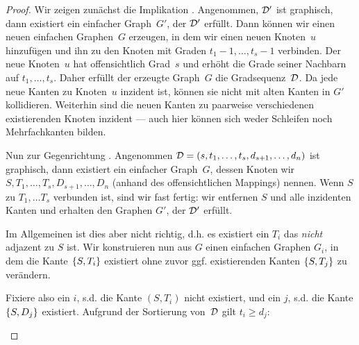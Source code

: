 \begin{proof}
    Wir  zeigen zunächst die Implikation .
    Angenommen, $\degseq'$ ist graphisch, dann existiert ein einfacher Graph~$G'$, der $\degseq'$ erfüllt.
    Dann können wir einen neuen einfachen Graphen~$G$ erzeugen, in dem wir einen neuen Knoten~$u$ hinzufügen und ihn zu den Knoten mit Graden $t_1{-}1, \ldots, t_s{-}1$ verbinden.
    Der neue Knoten~$u$ hat offensichtlich Grad~$s$ und erhöht die Grade seiner Nachbarn auf $t_1, \ldots, t_s$.
    Daher erfüllt der erzeugte Graph~$G$ die Gradsequenz~$\degseq$.
    Da jede neue Kanten zu Knoten~$u$ inzident ist, können sie nicht mit alten Kanten in $G'$ kollidieren.
    Weiterhin sind die neuen Kanten zu paarweise verschiedenen existierenden Knoten inzident --- auch hier können sich weder Schleifen noch Mehrfachkanten bilden.

    Nun  zur Gegenrichtung .
    Angenommen $\degseq = (s, t_1, \ldots, t_s, d_{s+1}, \ldots, d_n)$ ist graphisch, dann existiert ein einfacher Graph~$G$, dessen Knoten wir $S, T_1, \ldots, T_s, D_{s+1}, \ldots, D_n$ (anhand des offensichtlichen Mappings) nennen.
    Wenn $S$ zu $T_1, \ldots T_s$ verbunden ist, sind wir fast fertig: wir entfernen $S$ und alle inzidenten Kanten und erhalten den Graphen $G'$, der $\degseq'$ erfüllt.

    Im Allgemeinen ist dies aber nicht richtig, d.h. es existiert ein $T_i$ das \emph{nicht} adjazent zu $S$ ist.
    Wir konstruieren nun aus $G$ einen einfachen Graphen $G_i$, in dem die Kante $\set{S, T_i}$ existiert ohne zuvor ggf. existierenden Kanten $\set{S, T_j}$ zu verändern.

    Fixiere also ein $i$, s.d. die Kante $(S, T_i)$ nicht existiert, und ein $j$, s.d. die Kante $\set{S, D_j}$ existiert.
    Aufgrund der Sortierung von~$\degseq$ gilt $t_i \ge d_j$:
    \begin{figure}
        \begin{center}
            \begin{tikzpicture}[
                    node distance=4em,
                    node/.style={draw, inner sep=0, minimum width=1.5em, minimum height=1.5em, circle},
                    edge/.style={draw, thick, black},
                    nonedge/.style={draw, dashed, red},
                ]


\end{tikzpicture}
\end{center}
\end{figure}
\end{proof}
